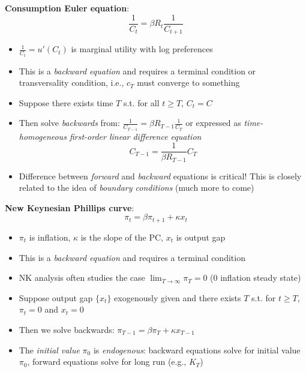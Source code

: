 \documentclass[10pt]{beamer}
\begin{document}
\begin{frame}{}
\textbf{Consumption Euler equation}:
\begin{equation*}
	\frac{1}{C_t} = \beta R_t\frac{1}{C_{t+1}}
\end{equation*}
\begin{itemize}
	\item $\frac{1}{C_t} = u'(C_t)$ is marginal utility with log preferences
	
	\item This is a \textit{backward equation} and requires a terminal condition or transversality condition, i.e., $c_T$ must converge to something
	
	\item Suppose there exists time $T$ s.t. for all $t \geq T$, $C_t = C$
	
	\item Then solve \textit{backwards} from: $\frac{1}{C_{T-1}} = \beta R_{T-1} \frac{1}{C_T}$ or expressed as \textit{time-homogeneous first-order linear difference equation}
	\begin{equation*}
		C_{T-1} = \frac{1}{\beta R_{T-1}} C_T
	\end{equation*}

	\item Difference between \textit{forward} and \textit{backward} equations is critical! This is closely related to the idea of \textit{boundary conditions} (much more to come)
\end{itemize}
\end{frame}



\begin{frame}{}
\textbf{New Keynesian Phillips curve}:
\begin{equation*}
	\pi_t = \beta \pi_{t+1} + \kappa x_t
\end{equation*}
\begin{itemize}
	\item $\pi_t$ is inflation, $\kappa$ is the slope of the PC, $x_t$ is output gap
	
	\item This is a \textit{backward equation} and requires a terminal condition
	
	\item NK analysis often studies the case $\lim_{T \to \infty} \pi_T = 0$ ($0$ inflation steady state)
	
	\item Suppose output gap $\{ x_t \}$ exogenously given and there exists $T$ s.t. for $t \geq T$, $\pi_t = 0$ and $x_t = 0$
	
	\item Then we solve backwards: $\pi_{T-1} = \beta \pi_T + \kappa x_{T-1}$
	
	\item The \textit{initial value} $\pi_0$ is \textit{endogenous}: backward equations solve for initial value $\pi_0$, forward equations solve for long run (e.g., $K_T$)
\end{itemize}
\end{frame}
\end{document}
